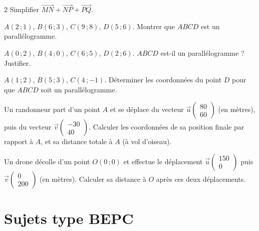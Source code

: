 \begin{multicols}{2}
\exo{} Simplifier $\vec{MN}+\vec{NP}+\vec{PQ}$.

\exo{} $A(2\,;1)$, $B(6\,;3)$, $C(9\,;8)$, $D(5\,;6)$. Montrer que $ABCD$ est un
parallélogramme.

\exo{} $A(0\,;2)$, $B(4\,;0)$, $C(6\,;5)$, $D(2\,;6)$. $ABCD$ est-il un
parallélogramme ? Justifier.

\exo{} $A(1\,;2)$, $B(5\,;3)$, $C(4\,;-1)$. Déterminer les coordonnées du point
$D$ pour que $ABCD$ soit un parallélogramme.

\exo{} Un randonneur part d'un point $A$ et se déplace du vecteur
$\vec u\begin{pmatrix}80\\60\end{pmatrix}$ (en mètres), puis du vecteur
$\vec v\begin{pmatrix}-30\\40\end{pmatrix}$. Calculer les coordonnées de sa position finale
par rapport à $A$, et sa distance totale à $A$ (à vol d'oiseau).

\exo{} Un drone décolle d'un point $O(0\,;0)$ et effectue le déplacement
$\vec u\begin{pmatrix}150\\0\end{pmatrix}$ puis $\vec v\begin{pmatrix}0\\200\end{pmatrix}$
(en mètres). Calculer sa distance à $O$ après ces deux déplacements.

\end{multicols}

\section{Sujets type BEPC}

